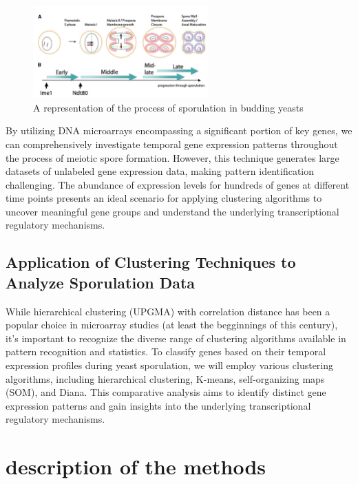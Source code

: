 \documentclass{llncs}
\begin{document}
\begin{figure}[h!]
	\begin{center}  %
		\includegraphics[width=0.6\textwidth]{images/sporlutation.png}
		\caption{A representation of the process of sporulation in budding yeasts}
		\label{fig:Sporlutation}
	\end{center}
\end{figure}

By utilizing DNA microarrays encompassing a significant portion of key genes, we can comprehensively investigate temporal gene expression patterns throughout the process of meiotic spore formation. However, this technique generates large datasets of unlabeled gene expression data, making pattern identification challenging. The abundance of expression levels for hundreds of genes at different time points presents an ideal scenario for applying clustering algorithms to uncover meaningful gene groups and understand the underlying transcriptional regulatory mechanisms.\cite{datta2003}

\subsection*{Application of Clustering Techniques to Analyze Sporulation Data}

While hierarchical clustering (UPGMA) with correlation distance has been a popular choice in microarray studies (at least the begginnings of this century), it's important to recognize the diverse range of clustering algorithms available in pattern recognition and statistics. To classify genes based on their temporal expression profiles during yeast sporulation, we will employ various clustering algorithms, including hierarchical clustering, K-means, self-organizing maps (SOM), and Diana. This comparative analysis aims to identify distinct gene expression patterns and gain insights into the underlying transcriptional regulatory mechanisms.\cite{datta2003}




\section{description of the methods}
\end{document}
